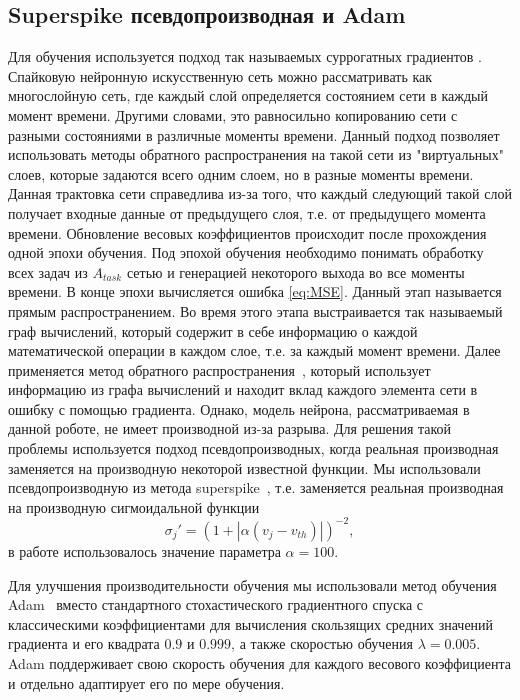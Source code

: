 \documentclass{article}
\begin{document}
\subsection{Superspike псевдопроизводная и Adam}
Для обучения используется подход так называемых суррогатных градиентов \cite{neftci2019surrogate}. Спайковую нейронную искусственную сеть можно рассматривать как многослойную сеть, где каждый слой определяется состоянием сети в каждый момент времени. Другими словами, это равносильно копированию сети с разными состояниями в различные моменты времени. Данный подход позволяет использовать методы обратного распространения на такой сети из "виртуальных" слоев, которые задаются всего одним слоем, но в разные моменты времени. Данная трактовка сети справедлива из-за того, что каждый следующий такой слой получает входные данные от предыдущего слоя, т.е. от предыдущего момента времени. Обновление весовых коэффициентов происходит после прохождения одной эпохи обучения. Под эпохой обучения необходимо понимать обработку всех задач из $A_{task}$ сетью и генерацией некоторого выхода во все моменты времени. В конце эпохи вычисляется ошибка \ref{eq:MSE}. Данный этап называется прямым распространением. Во время этого этапа выстраивается так называемый граф вычислений, который содержит в себе информацию о каждой математической операции в каждом слое, т.е. за каждый момент времени. Далее применяется метод обратного распространения~\cite{Goodfellow-et-al-2016}, который использует информацию из графа вычислений и находит вклад каждого элемента сети в ошибку с помощью градиента. Однако, модель нейрона, рассматриваемая в данной роботе, не имеет производной из-за разрыва. Для решения такой проблемы используется подход псевдопроизводных, когда реальная производная заменяется на производную некоторой известной функции. Мы использовали псевдопроизводную из метода superspike~\cite{zenke2018superspike}, т.е. заменяется реальная производная на производную сигмоидальной функции
\begin{equation}
  \sigma_j' = (1 + |\alpha (v_j - v_{th})|)^{-2},
\end{equation}
в работе использовалось значение параметра $\alpha = 100$.

Для улучшения производительности обучения мы использовали метод обучения Adam~\cite{kingma2014adam, Goodfellow-et-al-2016} вместо стандартного стохастического градиентного спуска с классическими коэффициентами  для вычисления скользящих средних значений градиента и его квадрата $0.9$ и $0.999$, а также скоростью обучения $\lambda = 0.005$. Adam поддерживает свою скорость обучения для каждого весового коэффициента и отдельно адаптирует его по мере обучения.
\end{document}
